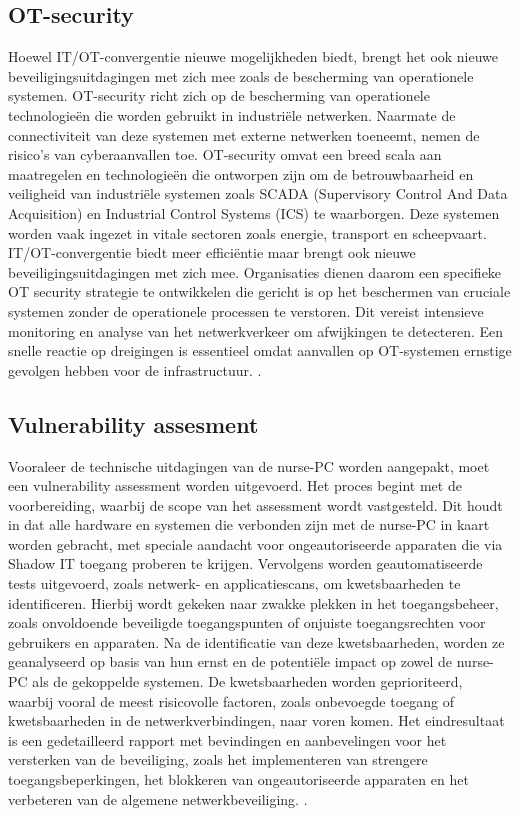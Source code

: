 \subsection{OT-security}
Hoewel IT/OT-convergentie nieuwe mogelijkheden biedt, brengt het ook nieuwe beveiligingsuitdagingen met zich mee zoals de bescherming van operationele systemen.
OT-security richt zich op de bescherming van operationele technologieën die worden gebruikt in industriële netwerken. Naarmate de connectiviteit van deze systemen 
met externe netwerken toeneemt, nemen de risico’s van cyberaanvallen toe. OT-security omvat een breed scala aan maatregelen en technologieën die ontworpen zijn om 
de betrouwbaarheid en veiligheid van industriële systemen zoals SCADA (Supervisory Control And Data Acquisition) en Industrial Control Systems (ICS) te waarborgen. Deze systemen worden vaak ingezet in vitale 
sectoren zoals energie, transport en scheepvaart. IT/OT-convergentie biedt meer efficiëntie maar brengt ook nieuwe 
beveiligingsuitdagingen met zich mee. Organisaties dienen daarom een specifieke OT security strategie te ontwikkelen die gericht is op het beschermen van cruciale systemen 
zonder de operationele processen te verstoren. Dit vereist intensieve monitoring en analyse van het netwerkverkeer om afwijkingen te detecteren. 
Een snelle reactie op dreigingen is essentieel omdat aanvallen op OT-systemen ernstige gevolgen hebben voor de infrastructuur. \autocite{Nomios2024}.

\subsection{Vulnerability assesment}
Vooraleer de technische uitdagingen van de nurse-PC worden aangepakt, moet een vulnerability assessment worden uitgevoerd. 
Het proces begint met de voorbereiding, waarbij de scope van het assessment wordt vastgesteld. Dit houdt in dat alle hardware en 
systemen die verbonden zijn met de nurse-PC in kaart worden gebracht, met speciale aandacht voor ongeautoriseerde apparaten die 
via Shadow IT toegang proberen te krijgen. Vervolgens worden geautomatiseerde tests uitgevoerd, zoals netwerk- en applicatiescans, 
om kwetsbaarheden te identificeren. Hierbij wordt gekeken naar zwakke plekken in het toegangsbeheer, zoals onvoldoende beveiligde 
toegangspunten of onjuiste toegangsrechten voor gebruikers en apparaten. Na de identificatie van deze kwetsbaarheden, worden ze 
geanalyseerd op basis van hun ernst en de potentiële impact op zowel de nurse-PC als de gekoppelde systemen. De kwetsbaarheden worden 
geprioriteerd, waarbij vooral de meest risicovolle factoren, zoals onbevoegde toegang of kwetsbaarheden in de netwerkverbindingen, 
naar voren komen. Het eindresultaat is een gedetailleerd rapport met bevindingen en aanbevelingen voor het versterken van de beveiliging, 
zoals het implementeren van strengere toegangsbeperkingen, het blokkeren van ongeautoriseerde apparaten en het verbeteren van de algemene 
netwerkbeveiliging. \autocite{HON2024}.


